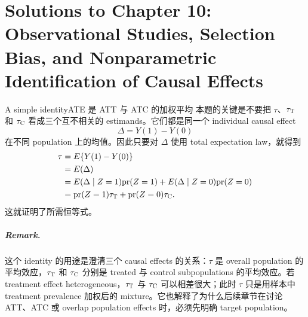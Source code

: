 \chapter{Solutions to Chapter 10: Observational Studies, Selection Bias, and Nonparametric Identification of Causal Effects}
\label{sol:chapter10}

\begin{exercisesolution}{A simple identity}{ATE 是 ATT 与 ATC 的加权平均}
本题的关键是不要把 $\tau$、$\tau_\textsc{T}$ 和 $\tau_\textsc{C}$ 看成三个互不相关的 estimands。它们都是同一个 individual causal effect
\[
\Delta=Y(1)-Y(0)
\]
在不同 population 上的均值。因此只要对 $\Delta$ 使用 total expectation law，就得到
\begin{align*}
\tau
&=E\{Y(1)-Y(0)\} \\
&=E(\Delta) \\
&=E(\Delta\mid Z=1)\textup{pr}(Z=1)
  +E(\Delta\mid Z=0)\textup{pr}(Z=0) \\
&=\textup{pr}(Z=1)\tau_\textsc{T}
  +\textup{pr}(Z=0)\tau_\textsc{C}.
\end{align*}
这就证明了所需恒等式。

\paragraph{Remark.}
这个 identity 的用途是澄清三个 causal effects 的关系：$\tau$ 是 overall population 的平均效应，$\tau_\textsc{T}$ 和 $\tau_\textsc{C}$ 分别是 treated 与 control subpopulations 的平均效应。若 treatment effect heterogeneous，$\tau_\textsc{T}$ 与 $\tau_\textsc{C}$ 可以相差很大；此时 $\tau$ 只是用样本中 treatment prevalence 加权后的 mixture。它也解释了为什么后续章节在讨论 ATT、ATC 或 overlap population effects 时，必须先明确 target population。
\end{exercisesolution}

